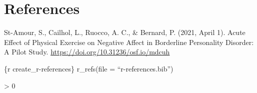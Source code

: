 \documentclass[
  english,
  man]{apa6}
\newlength{\cslhangindent}
\newenvironment{CSLReferences}[2] %
 {%
  \setlength{\parindent}{0pt}
  \ifodd #1 \everypar{\setlength{\hangindent}{\cslhangindent}}\ignorespaces\fi
  \ifnum #2 > 0
  \setlength{\parskip}{#2\baselineskip}
  \fi
 }%
 {}
\begin{document}
\newpage

\hypertarget{references}{%
\section{References}\label{references}}

St-Amour, S., Cailhol, L., Ruocco, A. C., \& Bernard, P. (2021, April 1). Acute Effect
of Physical Exercise on Negative Affect in Borderline Personality Disorder: A Pilot Study.
\url{https://doi.org/10.31236/osf.io/mdcuh}

\{r create\_r-references\}
r\_refs(file = ``r-references.bib'')

\begingroup
\setlength{\parindent}{-0.5in}
\setlength{\leftskip}{0.5in}

\hypertarget{refs}{}
\begin{CSLReferences}{0}{0}
\end{CSLReferences}

\endgroup
\end{document}
